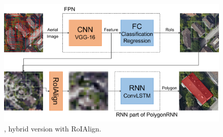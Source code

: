 \begin{figure}[!h]
	\centering
	\includegraphics[width=\fig\textwidth]{3-17.pdf}
    \caption[\modelnameshort, hybrid version with RoIAlign]{\modelnameshort, hybrid version with RoIAlign.}
    \label{fig:algmod}
\end{figure}